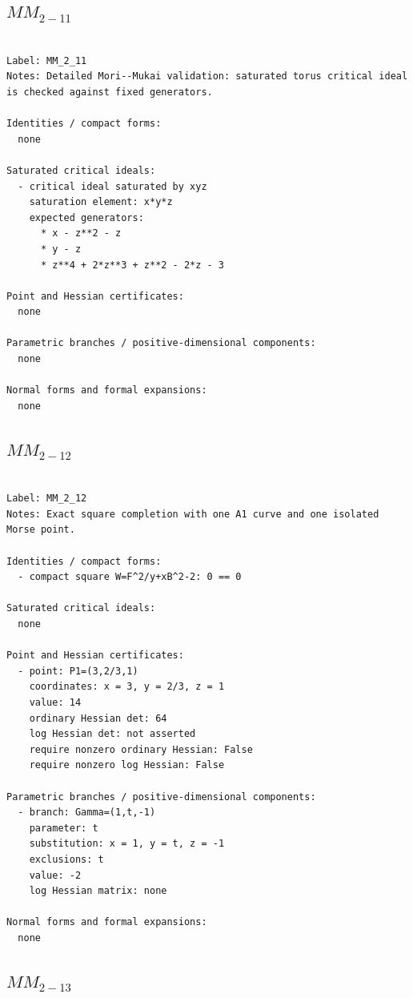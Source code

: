 \documentclass[10pt,a4paper]{article}
\begin{document}
\subsection*{$ MM_{2-11} $}

\begin{lstlisting}

Label: MM_2_11
Notes: Detailed Mori--Mukai validation: saturated torus critical ideal is checked against fixed generators.

Identities / compact forms:
  none

Saturated critical ideals:
  - critical ideal saturated by xyz
    saturation element: x*y*z
    expected generators:
      * x - z**2 - z
      * y - z
      * z**4 + 2*z**3 + z**2 - 2*z - 3

Point and Hessian certificates:
  none

Parametric branches / positive-dimensional components:
  none

Normal forms and formal expansions:
  none

\end{lstlisting}

\subsection*{$ MM_{2-12} $}

\begin{lstlisting}

Label: MM_2_12
Notes: Exact square completion with one A1 curve and one isolated Morse point.

Identities / compact forms:
  - compact square W=F^2/y+xB^2-2: 0 == 0

Saturated critical ideals:
  none

Point and Hessian certificates:
  - point: P1=(3,2/3,1)
    coordinates: x = 3, y = 2/3, z = 1
    value: 14
    ordinary Hessian det: 64
    log Hessian det: not asserted
    require nonzero ordinary Hessian: False
    require nonzero log Hessian: False

Parametric branches / positive-dimensional components:
  - branch: Gamma=(1,t,-1)
    parameter: t
    substitution: x = 1, y = t, z = -1
    exclusions: t
    value: -2
    log Hessian matrix: none

Normal forms and formal expansions:
  none

\end{lstlisting}

\subsection*{$ MM_{2-13} $}
\end{document}

